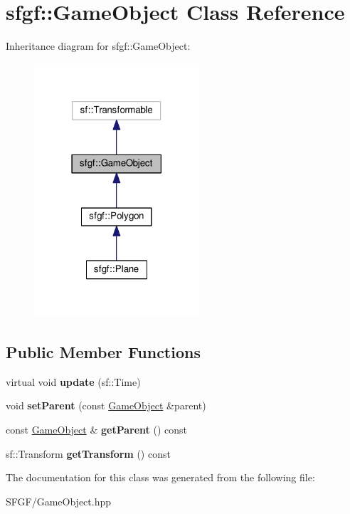 \hypertarget{classsfgf_1_1GameObject}{}\section{sfgf\+:\+:Game\+Object Class Reference}
\label{classsfgf_1_1GameObject}


Inheritance diagram for sfgf\+:\+:Game\+Object\+:\nopagebreak
\begin{figure}[H]
\begin{center}
\leavevmode
\includegraphics[width=174pt]{classsfgf_1_1GameObject__inherit__graph}
\end{center}
\end{figure}
\subsection*{Public Member Functions}
\begin{DoxyCompactItemize}
\item 
virtual void {\bfseries update} (sf\+::\+Time)\hypertarget{classsfgf_1_1GameObject_a0bf26d2cfdf041d3fe487cd3f44a48d9}{}\label{classsfgf_1_1GameObject_a0bf26d2cfdf041d3fe487cd3f44a48d9}

\item 
void {\bfseries set\+Parent} (const \hyperlink{classsfgf_1_1GameObject}{Game\+Object} \&parent)\hypertarget{classsfgf_1_1GameObject_ad7ca320499bed4ea5acd0cfadbd4031a}{}\label{classsfgf_1_1GameObject_ad7ca320499bed4ea5acd0cfadbd4031a}

\item 
const \hyperlink{classsfgf_1_1GameObject}{Game\+Object} \& {\bfseries get\+Parent} () const \hypertarget{classsfgf_1_1GameObject_a4c96ad96e5aa58d93f41b4896f95ff12}{}\label{classsfgf_1_1GameObject_a4c96ad96e5aa58d93f41b4896f95ff12}

\item 
sf\+::\+Transform {\bfseries get\+Transform} () const \hypertarget{classsfgf_1_1GameObject_a09b30b373b460ef9ad7b07faeb274324}{}\label{classsfgf_1_1GameObject_a09b30b373b460ef9ad7b07faeb274324}

\end{DoxyCompactItemize}


The documentation for this class was generated from the following file\+:\begin{DoxyCompactItemize}
\item 
S\+F\+G\+F/Game\+Object.\+hpp\end{DoxyCompactItemize}
